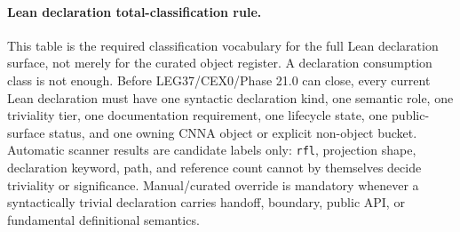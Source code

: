 \paragraph{Lean declaration total-classification rule.} This table is the required classification vocabulary for the full Lean declaration surface, not merely for the curated object register. A declaration consumption class is not enough. Before LEG37/CEX0/Phase 21.0 can close, every current Lean declaration must have one syntactic declaration kind, one semantic role, one triviality tier, one documentation requirement, one lifecycle state, one public-surface status, and one owning CNNA object or explicit non-object bucket. Automatic scanner results are candidate labels only: \texttt{rfl}, projection shape, declaration keyword, path, and reference count cannot by themselves decide triviality or significance. Manual/curated override is mandatory whenever a syntactically trivial declaration carries handoff, boundary, public API, or fundamental definitional semantics.

